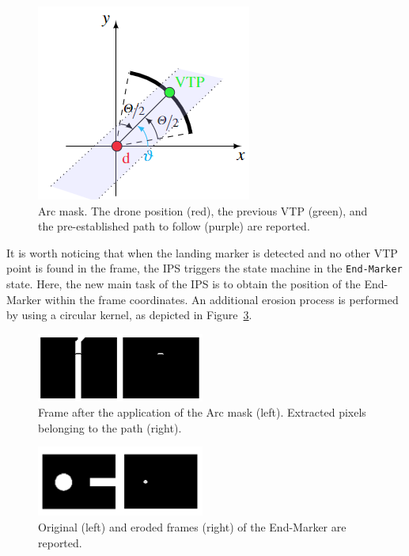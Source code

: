 \documentclass[a4paper,twocolumn,10pt]{article}
\begin{document}
    \begin{figure}
        \centering
        \includegraphics{pics/fig7_no.png}
        \caption{Arc mask. The drone position (red), the previous VTP (green), and the pre-established path to follow (purple) are reported.} 
        \label{fig:fig7arcMask}
    \end{figure}

    It is worth noticing that when the landing marker is detected and no other VTP point is found in the frame, the IPS triggers the state machine in the \texttt{End-Marker} state. Here, the new main task of the IPS is to obtain the position of the End-Marker within the frame coordinates. An additional erosion process is performed by using a circular kernel, as depicted in 
    Figure~\ref{fig:fig9frame}. 

    \begin{figure}
        \centering
        \includegraphics[width=0.49\textwidth]{pics/fig8_frame.png}
        \caption{Frame after the application of the Arc mask (left). Extracted pixels belonging to the 
        path (right).}
        \label{fig:fig8frames}
    \end{figure}
    \begin{figure}
        \centering
        \includegraphics[width=0.49\textwidth]{pics/fig9_frame.png}
        \caption{Original (left) and eroded frames (right) of the End-Marker are reported.}
        \label{fig:fig9frame}
    \end{figure}
\end{document}
